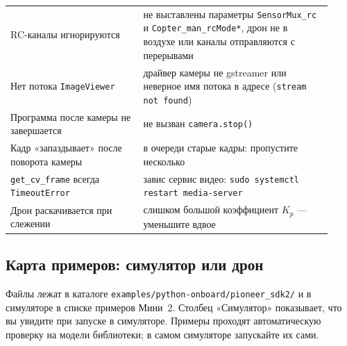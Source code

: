{\begin{longtable}{@{}>{\raggedright\arraybackslash}p{0.38\linewidth}>{\raggedright\arraybackslash}p{0.54\linewidth}@{}}
RC-каналы игнорируются & не выставлены параметры \texttt{SensorMux\_rc} и \texttt{Copter\_man\_rcMode*}, дрон не в воздухе или каналы отправляются с перерывами \\
Нет потока \verb|ImageViewer| & драйвер камеры не gstreamer или неверное имя потока в адресе (\texttt{stream not found}) \\
Программа после камеры не завершается & не вызван \verb|camera.stop()| \\
Кадр «запаздывает» после поворота камеры & в очереди старые кадры: пропустите несколько \\
\verb|get_cv_frame| всегда \verb|TimeoutError| & завис сервис видео: \verb|sudo systemctl restart media-server| \\
Дрон раскачивается при слежении & слишком большой коэффициент $K_p$ --- уменьшите вдвое \\
\bottomrule
\end{longtable}
}

\subsection{Карта примеров: симулятор или дрон}

Файлы лежат в каталоге \texttt{examples/python-onboard/pioneer\_sdk2/} и в симуляторе в списке примеров Мини~2. Столбец «Симулятор» показывает, что вы увидите при запуске в симуляторе. Примеры проходят автоматическую проверку на модели библиотеки; в самом симуляторе запускайте их сами.

